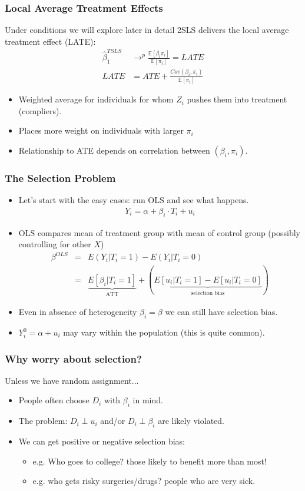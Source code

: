 \documentclass[xcolor=pdftex,dvipsnames,table,mathserif,aspectratio=169]{beamer}
\begin{document}
\begin{frame}
\frametitle{Local Average Treatment Effects}
Under conditions we will explore later in detail 2SLS delivers the \alert{local average treatment effect (LATE)}:
\begin{align*}
\widehat{\beta}_1^{TSLS} &\rightarrow^p \frac{\mathbb{E}[\beta_{i} \pi_{i}]}{\mathbb{E}[\pi_{i}]} = LATE \\
LATE &= ATE + \frac{Cov(\beta_{i},\pi_{i})}{\mathbb{E}[\pi_{i}]}
\end{align*}
\begin{itemize}
\item Weighted average for individuals for whom $Z_i$ pushes them into treatment (compliers).
\item Places more weight on individuals with larger $\pi_i$
\item Relationship to ATE depends on correlation between $(\beta_i, \pi_i)$.
\end{itemize}
\end{frame}


\begin{frame}
\frametitle{The Selection Problem}
\begin{itemize}
\item Let's start with the easy cases: run OLS and see what happens.
\begin{align*}
Y_i = \alpha + \beta_i \cdot T_i + u_i
\end{align*}
\item OLS compares mean of treatment group with mean of control group (possibly controlling for other $X$)
\begin{eqnarray*}
\beta^{OLS} &=& E(Y_i | T_i =1) - E(Y_i | T_i=0) \\
&=& \underbrace{E[\beta_i | T_i =1]}_{\mbox{ATT}} + \left(\underbrace{E[u_i | T_i =1 ] - E[u_i | T_i=0] }_{\mbox{selection bias}}  \right)
\end{eqnarray*}
\item Even in absence of heterogeneity $\beta_i = \beta$ we can still have selection bias. 
\item $Y_i^0 = \alpha + u_i$ may vary within the population (this is quite common).
\end{itemize}
\end{frame}

\begin{frame}
\frametitle{Why worry about selection?}
Unless we have random assignment...
\begin{itemize}
\item People often choose $D_i$ with $\beta_i$ in mind.
\item The problem: $D_i \perp u_i$ and/or $D_i \perp \beta_i$ are likely violated.
\item We can get positive or negative selection bias:
\begin{itemize}
\item e.g. Who goes to college? those likely to benefit more than most!
\item e.g. who gets risky surgeries/drugs? people who are very sick.
\end{itemize}
\end{itemize}
\end{frame}
\end{document}
